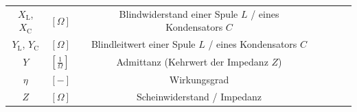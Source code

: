\begin{raggedright}
\begin{table}[H]
{\begin{tabular}{Sl Sc Sc Sl}
        $X_\text{L}$, $X_\text{C}$ & $\left[\Omega\right]$                            &                                                             & Blindwiderstand einer Spule $L$ / eines Kondensators $C$ \\
        $Y_\text{L}$, $Y_\text{C}$ & $\left[\Omega\right]$                            &                                                             & Blindleitwert einer Spule $L$ / eines Kondensators $C$ \\
        $Y$                        & $\left[\frac{1}{\Omega}\right]$                  &                                                             & Admittanz (Kehrwert der Impedanz $Z$) \\
        $\eta$                     & $\left[-\right]$                                 &                                                             & Wirkungsgrad \\
        $Z$                        & $\left[\Omega\right]$                            &                                                             & Scheinwiderstand / Impedanz
    \end{tabular}
    }
\end{table}

\end{raggedright}

\restoregeometry